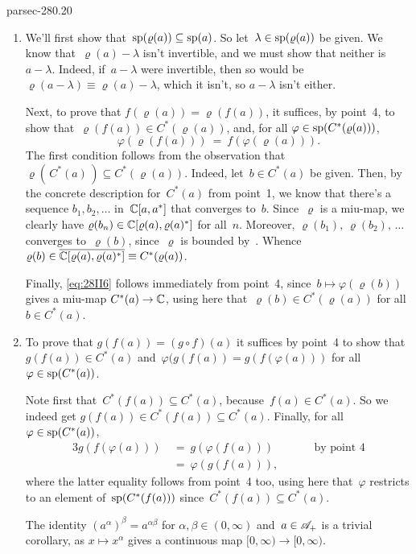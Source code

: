 \documentclass[b5page]{book}
\begin{document}
\begin{solution}{parsec-280.20}
\begin{enumerate}
\begin{alignat*}{3}
\qquad&&\text{by the previous point} \\
\ &=\ 
\spec(f(a))\qquad&&\text{by~\sref{parsec-270.170},}
\\
&&&\quad\text{since~$f(a)\in C^*(a)$}.
\end{alignat*}
\item
We'll first show that~$\mathrm{sp}(\varrho(a))\subseteq \mathrm{sp}(a)$.
So let~$\lambda\in \mathrm{sp}(\varrho(a))$ be given.
We know that~$\varrho(a)-\lambda$
isn't invertible,
and we must show that neither is~$a-\lambda$.
Indeed,
if~$a-\lambda$ were invertible,
then so would be $\varrho(a-\lambda)\equiv \varrho(a)-\lambda$,
which it isn't,
so $a-\lambda$ isn't either.

Next,
to prove that $f(\varrho(a))=\varrho(f(a))$,
it suffices, by point~4,
to show that~$\varrho(f(a))\in C^*(\varrho(a))$,
and,
for all
$\varphi\in\mathrm{sp}(C^*(\varrho(a)))$,
\begin{equation}
\label{eq:28II6}
\varphi(\varrho(f(a)))
\ =\ f(\varphi(\varrho(a))).
\end{equation}
The first condition
follows from the observation
that~$\varrho(\,C^*(a)\,)\subseteq C^*(\varrho(a))$.
Indeed,
let~$b\in C^*(a)$ be given.
Then, by the concrete description
for~$C^*(a)$ from point~1, we know that there's a sequence
$b_1,b_2,\dotsc$ in~$\mathbb{C}[a,a^*]$
that converges to~$b$.
Since~$\varrho$ is a miu-map,
we clearly have $\varrho(b_n)\in \mathbb{C}[\varrho(a),\varrho(a)^*]$
for all~$n$.
Moreover, $\varrho(b_1),\,\varrho(b_2),\,\dotsc$
converges to~$\varrho(b)$,
since~$\varrho$ is bounded
by~.
Whence~$\varrho(b)\in \overline{\mathbb{C}[\varrho(a),\varrho(a)^*]}
\equiv C^*(\varrho(a))$.

Finally,
\eqref{eq:28II6}
follows immediately from point~4,
since~$b\mapsto \varphi(\varrho(b))$
gives a miu-map $C^*(a)\to \mathbb{C}$,
using here that~$\varrho(b)\in C^*(\varrho(a))$
for all~$b\in C^*(a)$.
\item 
To prove that $g(f(a))=(g\circ f)(a)$
it suffices by point~4
to show that $g(f(a))\in C^*(a)$
and~$\varphi(g(f(a))=g(f(\varphi(a)))$
for all $\varphi\in\mathrm{sp}(C^*(a))$.

Note first that~$C^*(f(a))\subseteq C^*(a)$,
because~$f(a)\in C^*(a)$.
So we  indeed get $g(f(a))\in C^*(f(a))\subseteq C^*(a)$.
Finally,
for all~$\varphi\in \mathrm{sp}(C^*(a))$,
\begin{alignat*}{3}
g(f(\varphi(a)))
\ &=\ 
g(\varphi(f(a)))\qquad
&&\text{by point~4} \\
\ &=\ 
\varphi(g(f(a))),
\end{alignat*}
where the latter equality
follows from point~4 too,
using here that~$\varphi$
restricts to an element of~$\mathrm{sp}(C^*(f(a)))$
since~$C^*(f(a))\subseteq C^*(a)$.

The identity $(a^\alpha)^\beta = a^{\alpha\beta}$
for $\alpha,\beta\in(0,\infty)$
and~$a\in\mathscr{A}_+$
is a trivial corollary,
as $x\mapsto x^\alpha$
gives a continuous map $[0,\infty)\to [0,\infty)$.
\end{enumerate}
\end{solution}
\end{document}
